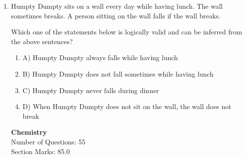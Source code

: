 \documentclass[journal,12pt,onecolumn]{exam}
\theoremstyle{remark}
\newcommand{\correct}{\textcolor{correctgreen}{\checkmark}}
\newcommand{\wrong}{\textcolor{wrongred}{\ding{55}}} %
\newcommand{\cross}{\textcolor{wrongred}{\ding{55}}}
\newcommand{\tick}{\textcolor{correctgreen}{\ding{51}}}
\begin{document}
\begin{enumerate}
 

\hfill{}

 

\begin{multicols}{4}
 \begin{enumerate}
    \item \textcolor{wrongred}{\cross\ 1 : 4}
    \item \textcolor{wrongred}{\cross\ 1 : 3}
    \item \textcolor{correctgreen}{\tick\ 1 : 2}
    \item \textcolor{wrongred}{\cross\ 2 : 3}
\end{enumerate}
\end{multicols}

 

\item 

Humpty Dumpty sits on a wall every day while having lunch. The wall sometimes breaks. A person sitting on the wall falls if the wall breaks.

Which one of the statements below is logically valid and can be inferred from the above sentences?

\hfill{}

 

\begin{multicols}{2}
\begin{enumerate}
    \item \textcolor{red}{\wrong} A) Humpty Dumpty always falls while having lunch
    \item \textcolor{green}{\correct} B) Humpty Dumpty does not fall sometimes while having lunch
    \item \textcolor{red}{\wrong} C) Humpty Dumpty never falls during dinner
    \item \textcolor{red}{\wrong} D) When Humpty Dumpty does not sit on the wall, the wall does not break
\end{enumerate}
\end{multicols}
 



\begin{center}
\textbf{Chemistry} \\
Number of Questions: \hspace{3 cm} 55 \\
Section Marks: \hspace{4 cm} 85.0
\end{center}


\end{enumerate}
\end{document}
